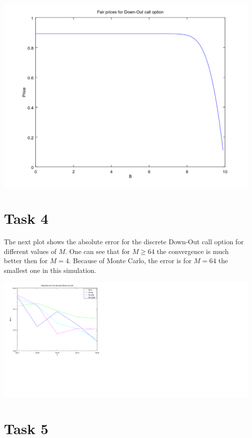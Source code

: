 \documentclass[10pt,a4paper]{article}
\begin{document}
\begin{center}
	\includegraphics[scale=0.7]{fair_prices_down_out_call.png}
\end{center}

\section*{Task 4}

The next plot shows the absolute error for the discrete Down-Out call option for different values of $M$. One can see that for $M\geq64$ the convergence is much better then for $M=4$. Because of Monte Carlo, the error is for $M=64$ the smallest one in this simulation.

\begin{center}
	\includegraphics[scale=0.7]{convergence_plot_discrete_down_out_call.png}
\end{center}

\section*{Task 5}
\end{document}
